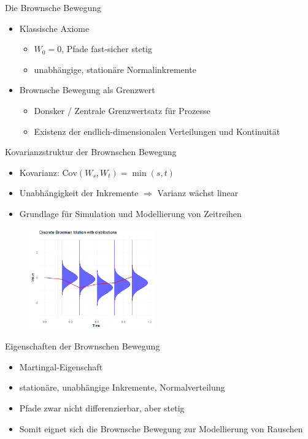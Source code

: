 \documentclass{beamer}
\begin{document}
\begin{frame}{Die Brownsche Bewegung}
  \begin{itemize}
  \item Klassische Axiome
    \begin{itemize}
      \item $W_0=0$, Pfade fast-sicher stetig
      \item unabhängige, stationäre Normalinkremente
    \end{itemize}
  \item Brownsche Bewegung als Grenzwert
    \begin{itemize}
      \item Donsker / Zentrale Grenzwertsatz für Prozesse
      \item Existenz der endlich-dimensionalen Verteilungen und Kontinuität
    \end{itemize}
\end{itemize}
\end{frame}

\begin{frame}{Kovarianzstruktur der Brownschen Bewegung}
  \begin{itemize}
    \item Kovarianz: $\mathrm{Cov}(W_s,W_t)=\min(s,t)$
  \item Unabhängigkeit der Inkremente $\Rightarrow$ Varianz wächst linear
    \item Grundlage für Simulation und Modellierung von Zeitreihen
  \end{itemize}
  \begin{figure}
    \centering
  \includegraphics[width=0.48\textwidth]{../thesis/images/bb_with_cov.png}
  \end{figure}
\end{frame}

\begin{frame}{Eigenschaften der Brownschen Bewegung}
  \begin{itemize}
      \item Martingal-Eigenschaft
      \item stationäre, unabhängige Inkremente, Normalverteilung
      \item Pfade zwar nicht differenzierbar, aber stetig
      \item Somit eignet sich die Brownsche Bewegung zur Modellierung von Rauschen
  \end{itemize}
\end{frame}
\end{document}
